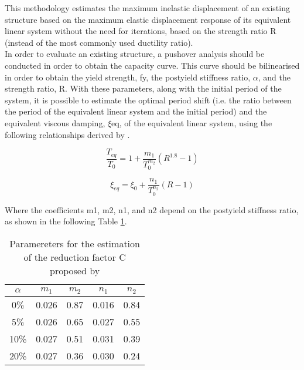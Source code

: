 This methodology estimates the maximum inelastic displacement of an existing structure based on the maximum elastic displacement response of its equivalent linear system without the need for iterations, based on the strength ratio R (instead of the most commonly used ductility ratio).\\

In order to evaluate an existing structure, a pushover analysis should be conducted in order to obtain the capacity curve. This curve should be bilinearised in order to obtain the yield strength, fy, the postyield stiffness ratio, $\alpha$, and the strength ratio, R. With these parameters, along with the initial period of the system, it is possible to estimate the optimal period shift (i.e. the ratio between the period of the equivalent linear system and the initial period) and the equivalent viscous damping, $\xi$eq, of the equivalent linear system, using the following relationships derived by \citep{LinMiranda2008}.
	 
\begin{equation}
\frac{T_{eq}}{T_{0}} = 1 + \frac{m_1}{T_0^{m_2}}\left(R^{1.8}-1\right)
\end{equation} 

\begin{equation}
\xi_{eq} = \xi_{0} + \frac{n_1}{T_0^{n_2}}\left(R-1\right)
\end{equation}   

Where the coefficients m1, m2, n1, and n2 depend on the postyield stiffness ratio, as shown in the following Table \ref{table:LinMiranda2008}.

\begin {table}
\caption{Paramereters for the estimation of the reduction factor C proposed by \citep{LinMiranda2008}} 
\label{table:LinMiranda2008} 
\begin{center}
  \begin{tabular}{ | c | c | c | c | c |}
    \hline
    $\alpha$ & $m_1$ & $m_2$ & $n_1$ & $n_2$ \\ \hline
    0\% & 0.026 & 0.87 & 0.016 & 0.84 \\ \hline
    5\% & 0.026 & 0.65 & 0.027 & 0.55 \\ \hline
    10\% & 0.027 & 0.51 & 0.031 & 0.39 \\ \hline
    20\% & 0.027 & 0.36 & 0.030 & 0.24 \\ \hline
  \end{tabular}
\end{center}
\end{table}

